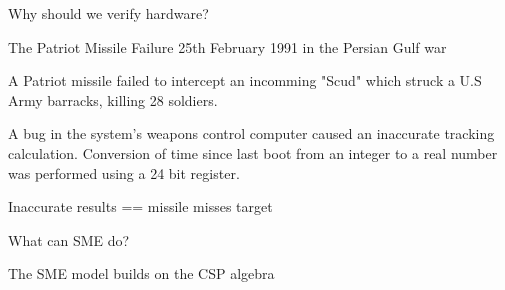 \documentclass[13pt]{beamer}
\begin{document}
\begin{frame}{Why should we verify hardware?}
  \begin{block}{The Patriot Missile Failure}
    25th February 1991 in the Persian Gulf war
  \end{block}

  \pause

  \begin{block}{}
     A Patriot missile failed to intercept an incomming "Scud" which struck a U.S Army barracks, killing 28 soldiers.
  \end{block}

  \pause

  \begin{block}{}
     A bug in the system's weapons control computer caused an inaccurate tracking calculation.
     Conversion of time since last boot from an integer to a real number was performed using a 24 bit register.
  \end{block}

  \pause

  \begin{block}{}
     Inaccurate results == missile misses target
  \end{block}

\end{frame}
%
\begin{frame}{What can SME do?}
 \begin{block}{}
   The SME model builds on the CSP algebra
 \end{block}
\end{frame}
%
\end{document}
